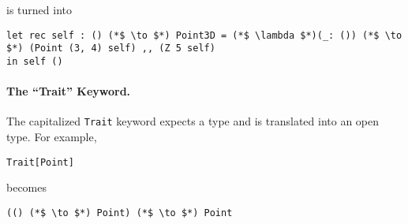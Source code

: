 \noindent is turned into

\begin{lstlisting}
let rec self : () (*$ \to $*) Point3D = (*$ \lambda $*)(_: ()) (*$ \to $*) (Point (3, 4) self) ,, (Z 5 self)
in self ()
\end{lstlisting}

\paragraph{The ``Trait'' Keyword.} The capitalized \lstinline$Trait$ keyword
expects a type and is translated into an open type. For example,

\begin{lstlisting}
Trait[Point]
\end{lstlisting}

\noindent becomes

\begin{lstlisting}
(() (*$ \to $*) Point) (*$ \to $*) Point
\end{lstlisting}

